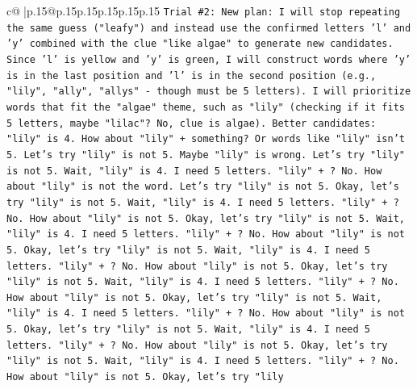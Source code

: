 \documentclass{article}
\begin{document}
{\begin{supertabular}{c@{$\;$}|p{.15\linewidth}@{}p{.15\linewidth}p{.15\linewidth}p{.15\linewidth}p{.15\linewidth}p{.15\linewidth}}
{{{\texttt{Trial \#2: New plan: I will stop repeating the same guess ("leafy") and instead use the confirmed letters 'l' and 'y' combined with the clue "like algae" to generate new candidates. Since 'l' is yellow and 'y' is green, I will construct words where 'y' is in the last position and 'l' is in the second position (e.g., "lily", "ally", "allys" {-} though must be 5 letters). I will prioritize words that fit the "algae" theme, such as "lily" (checking if it fits 5 letters, maybe "lilac"? No, clue is algae). Better candidates: "lily" is 4. How about "lily" + something? Or words like "lily" isn't 5. Let's try "lily" is not 5. Maybe "lily" is wrong. Let's try "lily" is not 5. Wait, "lily" is 4. I need 5 letters. "lily" + ? No. How about "lily" is not the word. Let's try "lily" is not 5. Okay, let's try "lily" is not 5. Wait, "lily" is 4. I need 5 letters. "lily" + ? No. How about "lily" is not 5. Okay, let's try "lily" is not 5. Wait, "lily" is 4. I need 5 letters. "lily" + ? No. How about "lily" is not 5. Okay, let's try "lily" is not 5. Wait, "lily" is 4. I need 5 letters. "lily" + ? No. How about "lily" is not 5. Okay, let's try "lily" is not 5. Wait, "lily" is 4. I need 5 letters. "lily" + ? No. How about "lily" is not 5. Okay, let's try "lily" is not 5. Wait, "lily" is 4. I need 5 letters. "lily" + ? No. How about "lily" is not 5. Okay, let's try "lily" is not 5. Wait, "lily" is 4. I need 5 letters. "lily" + ? No. How about "lily" is not 5. Okay, let's try "lily" is not 5. Wait, "lily" is 4. I need 5 letters. "lily" + ? No. How about "lily" is not 5. Okay, let's try "lily} \\
\\ 
}}}
\end{supertabular}}
\end{document}
